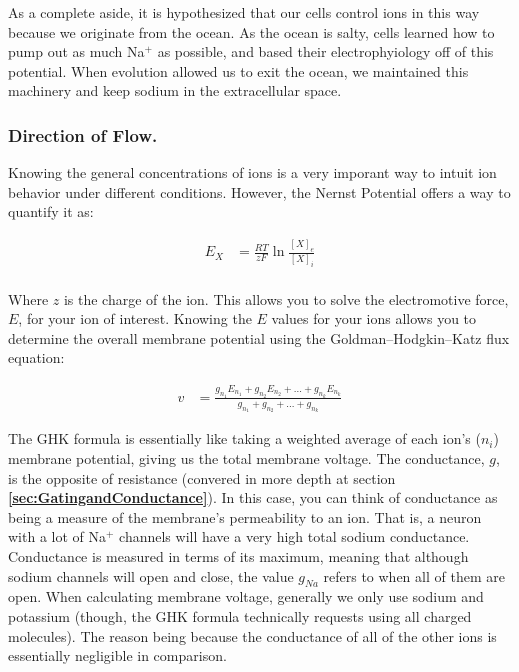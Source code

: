 As a complete aside, it is hypothesized that our cells control ions in this way because we originate from the ocean. As the ocean is salty, cells learned how to pump out as much Na$^+$ as possible, and based their electrophyiology off of this potential. When evolution allowed us to exit the ocean, we maintained this machinery and keep sodium in the extracellular space. 

\subsubsection{Direction of Flow.}

Knowing the general concentrations of ions is a very imporant way to intuit ion behavior under different conditions. However, the Nernst Potential offers a way to quantify it as: 

\begin{equation} \label{Nernst1}
\begin{split}
E_X &= \frac{RT}{zF}\ln\frac{[X]_e}{[X]_i}\\
\end{split}
\end{equation}

Where $z$ is the charge of the ion. This allows you to solve the electromotive force, $E$, for your ion of interest. Knowing the $E$ values for your ions allows you to determine the overall membrane potential using the Goldman–Hodgkin–Katz flux equation:

\begin{equation} \label{GHK}
\begin{split}
v &= \frac{g_{n_1}E_{n_1} + g_{n_2}E_{n_2} + ... + g_{n_k}E_{n_k}}{g_{n_1} + g_{n_2} + ... + g_{n_k}}
\end{split}
\end{equation}

The GHK formula is essentially like taking a weighted average of each ion's ($n_i$) membrane potential, giving us the total membrane voltage. The conductance, $g$, is the opposite of resistance (convered in more depth at section \textbf{\ref{sec:GatingandConductance}}). In this case, you can think of conductance as being a measure of the membrane's permeability to an ion. That is, a neuron with a lot of Na$^+$ channels will have a very high total sodium conductance. Conductance is measured in terms of its maximum, meaning that although sodium channels will open and close, the value $g_{Na}$ refers to when all of them are open. When calculating membrane voltage, generally we only use sodium and potassium (though, the GHK formula technically requests using all charged molecules). The reason being because the conductance of all of the other ions is essentially negligible in comparison.\newline

